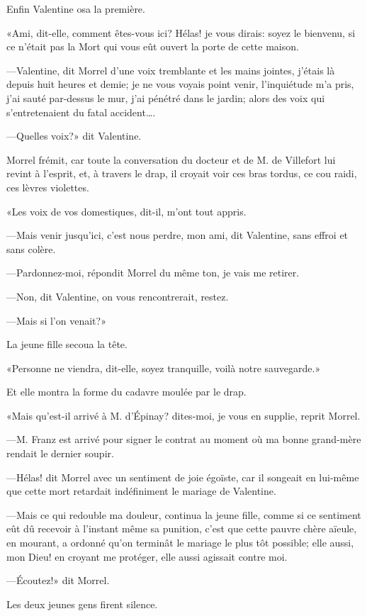 Enfin Valentine osa la première. 

«Ami, dit-elle, comment êtes-vous ici? Hélas! je vous dirais: soyez le bienvenu, si ce n'était pas la Mort qui vous eût ouvert la porte de cette maison. 

—Valentine, dit Morrel d'une voix tremblante et les mains jointes, j'étais là depuis huit heures et demie; je ne vous voyais point venir, l'inquiétude m'a pris, j'ai sauté par-dessus le mur, j'ai pénétré dans le jardin; alors des voix qui s'entretenaient du fatal accident\dots. 

—Quelles voix?» dit Valentine. 

Morrel frémit, car toute la conversation du docteur et de M. de Villefort lui revint à l'esprit, et, à travers le drap, il croyait voir ces bras tordus, ce cou raidi, ces lèvres violettes.  

«Les voix de vos domestiques, dit-il, m'ont tout appris. 

—Mais venir jusqu'ici, c'est nous perdre, mon ami, dit Valentine, sans effroi et sans colère. 

—Pardonnez-moi, répondit Morrel du même ton, je vais me retirer. 

—Non, dit Valentine, on vous rencontrerait, restez. 

—Mais si l'on venait?» 

La jeune fille secoua la tête. 

«Personne ne viendra, dit-elle, soyez tranquille, voilà notre sauvegarde.» 

Et elle montra la forme du cadavre moulée par le drap. 

«Mais qu'est-il arrivé à M. d'Épinay? dites-moi, je vous en supplie, reprit Morrel. 

—M. Franz est arrivé pour signer le contrat au moment où ma bonne grand-mère rendait le dernier soupir. 

—Hélas! dit Morrel avec un sentiment de joie égoïste, car il songeait en lui-même que cette mort retardait indéfiniment le mariage de Valentine. 

—Mais ce qui redouble ma douleur, continua la jeune fille, comme si ce sentiment eût dû recevoir à l'instant même sa punition, c'est que cette pauvre chère aïeule, en mourant, a ordonné qu'on terminât le mariage le plus tôt possible; elle aussi, mon Dieu! en croyant me protéger, elle aussi agissait contre moi. 

—Écoutez!» dit Morrel. 

Les deux jeunes gens firent silence. 


